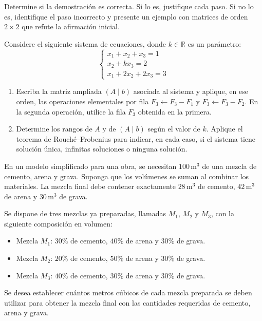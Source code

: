 \documentclass[10pt,a4]{examenEPN0}
\begin{document}
\begin{preguntas}
    
    Determine si la demostración es correcta. Si lo es, justifique cada paso. Si no lo es, identifique el paso incorrecto y presente un ejemplo con matrices de orden $2\times2$ que refute la afirmación inicial.


\par\vfill\newpage

\item 

Considere el siguiente sistema de ecuaciones, donde $k \in \mathbb{R}$ es un parámetro:
\[
\begin{cases}
x_1 + x_2 + x_3 = 1 \\
x_2 + kx_3 = 2 \\
x_1 + 2x_2 + 2x_3 = 3
\end{cases}
\]
\begin{enumerate}
    \item Escriba la matriz ampliada $(A \mid b)$ asociada al sistema y aplique, en ese orden, las operaciones elementales por fila $F_3 \leftarrow F_3-F_1$ y $F_3 \leftarrow F_3-F_2$. En la segunda operación, utilice la fila $F_3$ obtenida en la primera. 

    \item Determine los rangos de $A$ y de $(A \mid b)$ según el valor de $k$. Aplique el teorema de Rouché--Frobenius para indicar, en cada caso, si el sistema tiene solución única, infinitas soluciones o ninguna solución. 
\end{enumerate}


\par\vfill\newpage


\item En un modelo simplificado para una obra, se necesitan $100\,\text{m}^3$ de una mezcla de cemento, arena y grava. Suponga que los volúmenes se suman al combinar los materiales. La mezcla final debe contener exactamente $28\,\text{m}^3$ de cemento, $42\,\text{m}^3$ de arena y $30\,\text{m}^3$ de grava.

Se dispone de tres mezclas ya preparadas, llamadas $M_1$, $M_2$ y $M_3$, con la siguiente composición en volumen:
\begin{itemize}
    \item Mezcla $M_1$: $30\%$ de cemento, $40\%$ de arena y $30\%$ de grava.
    \item Mezcla $M_2$: $20\%$ de cemento, $50\%$ de arena y $30\%$ de grava.
    \item Mezcla $M_3$: $40\%$ de cemento, $30\%$ de arena y $30\%$ de grava.
\end{itemize}
Se desea establecer cuántos metros cúbicos de cada mezcla preparada se deben utilizar para obtener la mezcla final con las cantidades requeridas de cemento, arena y grava.


\end{preguntas}
\end{document}
